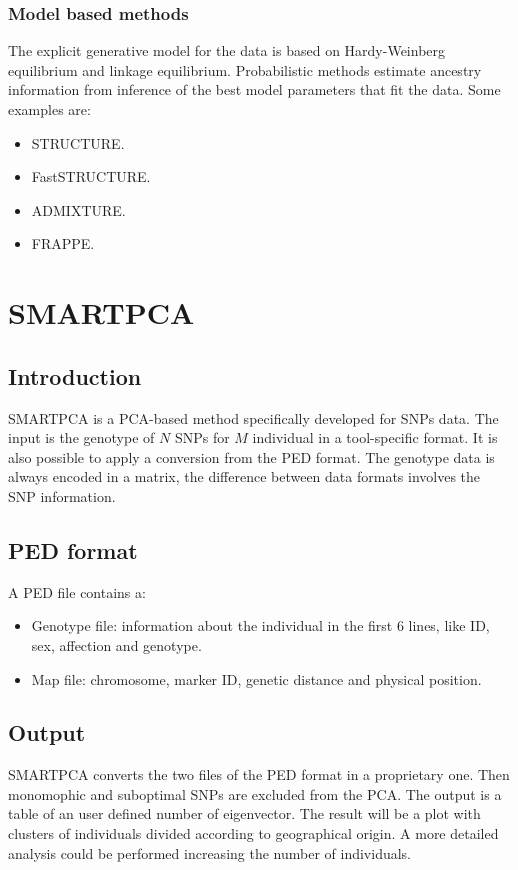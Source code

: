 		\subsubsection{Model based methods}
		The explicit generative model for the data is based on Hardy-Weinberg equilibrium and linkage equilibrium.
		Probabilistic methods estimate ancestry information from inference of the best model parameters that fit the data.
		Some examples are:

		\begin{multicols}{4}
			\begin{itemize}
				\item STRUCTURE.
				\item FastSTRUCTURE.
				\item ADMIXTURE.
				\item FRAPPE.
			\end{itemize}
		\end{multicols}

\section{SMARTPCA}

	\subsection{Introduction}
	SMARTPCA is a PCA-based method specifically developed for SNPs data.
	The input is the genotype of $N$ SNPs for $M$ individual in a tool-specific format.
	It is also possible to apply a conversion from the PED format.
	The genotype data is always encoded in a matrix, the difference between data formats involves the SNP information.

	\subsection{PED format}
	A PED file contains a:

	\begin{multicols}{2}
		\begin{itemize}
			\item Genotype file: information about the individual in the first $6$ lines, like ID, sex, affection and genotype.
			\item Map file: chromosome, marker ID, genetic distance and physical position.
		\end{itemize}
	\end{multicols}

	\subsection{Output}
	SMARTPCA converts the two files of the PED format in a proprietary one.
	Then monomophic and suboptimal SNPs are excluded from the PCA.
	The output is a table of an user defined number of eigenvector.
	The result will be a plot with clusters of individuals divided according to geographical origin.
	A more detailed analysis could be performed increasing the number of individuals.

